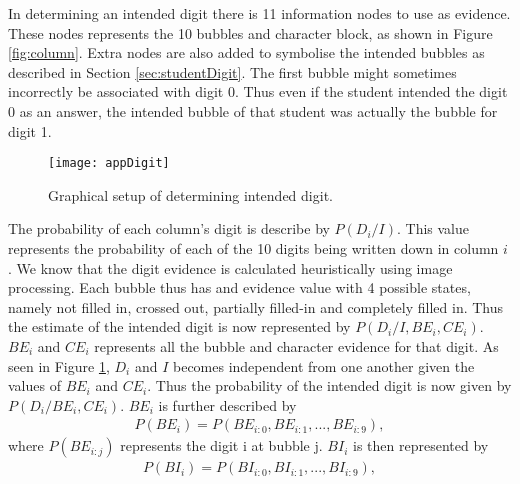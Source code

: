 In determining an intended digit there is 11 information nodes to use as evidence. These nodes represents the 10 bubbles and character block, as shown in Figure \ref{fig:column}. Extra nodes are also added to symbolise the intended bubbles as described in Section \ref{sec:studentDigit}. The first bubble might sometimes incorrectly be associated with digit 0. Thus even if the student intended the digit 0 as an answer, the intended bubble of that student was actually the bubble for digit 1.

\begin{figure}
  \centering
  \texttt{[image: appDigit]}\\
  \caption{Graphical setup of determining intended digit.}
  \label{fig:appDigit}
\end{figure}

The probability of each column's digit is describe by $P(D_i/I)$. This value represents the probability of each of the 10 digits being written down in column $i$ . We know that the digit evidence is calculated heuristically using image processing. Each bubble thus has and evidence value with 4 possible states, namely not filled in, crossed out, partially filled-in and completely filled in. Thus the estimate of the intended digit is now represented by $P(D_i/I,BE_i,CE_i)$. $BE_i$ and $CE_i$ represents all the bubble and character evidence for that digit. As seen in Figure \ref{fig:appDigit}, $D_i$ and $I$ becomes independent from one another given the values of $BE_i$ and $CE_i$. Thus the probability of the intended digit is now given by $P(D_i/BE_i,CE_i)$.
$BE_i$ is further described by 
\begin{align}
  P(BE_i) =  P(BE_{i:0},BE_{i:1},...,BE_{i:9}),
\label{eqn:ansIndep}
\end{align}
where  $P(BE_{i:j})$ represents the digit i at bubble j. $BI_i$ is then represented by
\begin{align}
  P(BI_i) =  P(BI_{i:0},BI_{i:1},...,BI_{i:9}),
\label{eqn:ansIndep}
\end{align}

